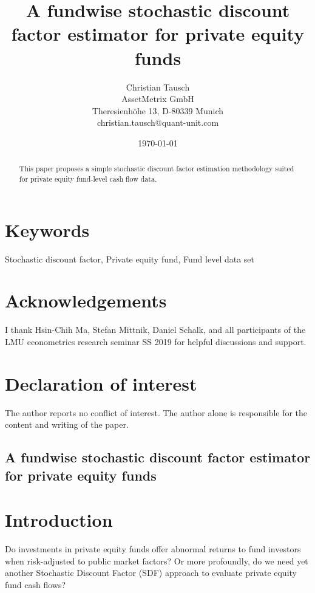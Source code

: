 \documentclass[12pt]{article}
\title{A fundwise stochastic discount factor estimator for private equity funds}
\author{
	Christian Tausch  \\
	AssetMetrix GmbH  \\
	Theresienh\"{o}he 13, D-80339 Munich \\
	christian.tausch@quant-unit.com \\
	}
\date{\today}
\begin{document}
\maketitle


\section*{Keywords}
Stochastic discount factor, Private equity fund, Fund level data set


\section*{Acknowledgements}
I thank Hsin-Chih Ma, Stefan Mittnik, Daniel Schalk, and all participants of the LMU econometrics research seminar SS 2019 for helpful discussions and support.


\section*{Declaration of interest}
The author reports no conflict of interest. 
The author alone is responsible for the content and writing of the paper.


\newpage

\begin{center} 
\section*{A fundwise stochastic discount factor estimator for private equity funds}
\end{center}



\begin{abstract}
This paper proposes a simple stochastic discount factor estimation methodology suited for private equity fund-level cash flow data.
\end{abstract}

\section{Introduction}
Do investments in private equity funds offer abnormal returns to fund investors when risk-adjusted to public market factors?
Or more profoundly, do we need yet another Stochastic Discount Factor (SDF) approach to evaluate private equity fund cash flows?
\end{document}
